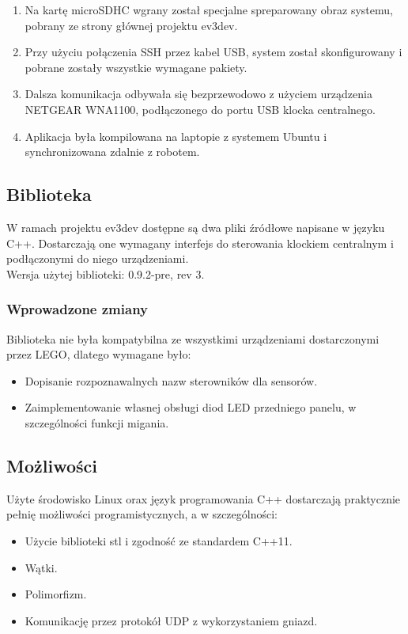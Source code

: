 \begin{enumerate}
    \item Na kartę microSDHC wgrany został specjalne spreparowany obraz systemu, pobrany ze strony głównej projektu ev3dev.
    \item Przy użyciu połączenia SSH przez kabel USB, system został skonfigurowany i pobrane zostały wszystkie wymagane pakiety.
    \item Dalsza komunikacja odbywała się bezprzewodowo z użyciem urządzenia NETGEAR WNA1100, podłączonego do portu USB klocka centralnego.
    \item Aplikacja była kompilowana na laptopie z systemem Ubuntu i synchronizowana zdalnie z robotem.
\end{enumerate}

\subsection{Biblioteka}
W ramach projektu ev3dev dostępne są dwa pliki źródłowe napisane w języku C++. Dostarczają one wymagany interfejs do sterowania klockiem centralnym i podłączonymi do niego urządzeniami.\\

\noindent Wersja użytej biblioteki: 0.9.2-pre, rev 3.

\subsubsection{Wprowadzone zmiany}
Biblioteka nie była kompatybilna ze wszystkimi urządzeniami dostarczonymi przez LEGO, dlatego wymagane było:
\begin{itemize}
    \item Dopisanie rozpoznawalnych nazw sterowników dla sensorów.
    \item Zaimplementowanie własnej obsługi diod LED przedniego panelu, w szczególności funkcji migania.
\end{itemize}

\subsection{Możliwości}
Użyte środowisko Linux orax język programowania C++ dostarczają praktycznie pełnię możliwości programistycznych, a w szczególności:
\begin{itemize}
    \item Użycie biblioteki stl i zgodność ze standardem C++11.
    \item Wątki.
    \item Polimorfizm.
    \item Komunikację przez protokół UDP z wykorzystaniem gniazd.
\end{itemize}


